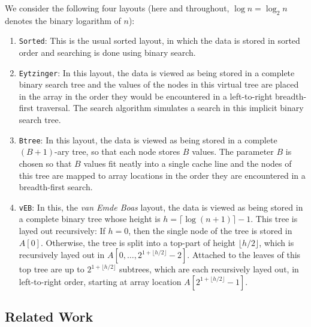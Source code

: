 \documentclass{patmorin}
\begin{document}
We consider the following four layouts (here and throughout, $\log
n=\log_2 n$ denotes the binary logarithm of $n$):

\begin{enumerate}
  \item \texttt{Sorted}:  This is the usual sorted layout, in which
  the data is stored in sorted order and searching is done using binary
  search.

  \item \texttt{Eytzinger}: In this layout, the data is viewed as being
  stored in a complete binary search tree and the values of the nodes
  in this virtual tree are placed in the array in the order they would
  be encountered in a left-to-right breadth-first traversal.  The search
  algorithm simulates a search in this implicit binary search tree.


  \item \texttt{Btree}: In this layout, the data is viewed as being stored
  in a complete $(B+1)$-ary tree, so that each node stores $B$ values.
  The parameter $B$ is chosen so that $B$ values fit neatly into a single
  cache line and the nodes of this tree are mapped to array locations in
  the order they are encountered in a breadth-first search.


  \item \texttt{vEB}: In this, the \emph{van Emde Boas} layout,
  the data is viewed as being stored in a complete binary tree
  whose height is $h=\lceil\log (n+1)\rceil -1$. This tree is layed
  out recursively:  If $h=0$, then the single node of the tree is
  stored in $A[0]$.  Otherwise, the tree is split into a top-part
  of height $\lfloor h/2\rfloor$, which is recursively layed out in
  $A[0,\ldots,2^{1+\lfloor{h/2\rfloor}}-2]$.  Attached to the leaves of
  this top tree are up to $2^{1+\lfloor{h/2\rfloor}}$ subtrees, which
  are each recursively layed out, in left-to-right order, starting at
  array location $A[2^{1+\lfloor{h/2\rfloor}}-1]$.
\end{enumerate}

\subsection{Related Work}
\end{document}

